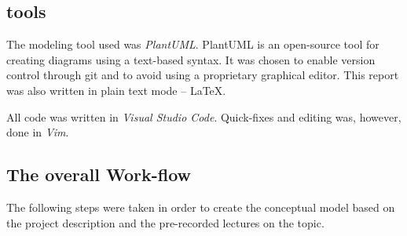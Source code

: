 \documentclass[a4paper]{scrartcl}
\begin{document}




\subsection*{tools}
The modeling tool used was \emph{PlantUML}.
PlantUML is an open-source tool for creating diagrams using a text-based
syntax.
It was chosen to enable version control through git and to avoid using a
proprietary graphical editor.
This report was also written in plain text mode -- \LaTeX.

All code was written in \emph{Visual Studio Code}.
Quick-fixes and editing was, however, done in \emph{Vim}.

\subsection*{The overall Work-flow}
The following steps were taken in order to create the conceptual model based on the project description and the pre-recorded lectures on the topic.
\end{document}

